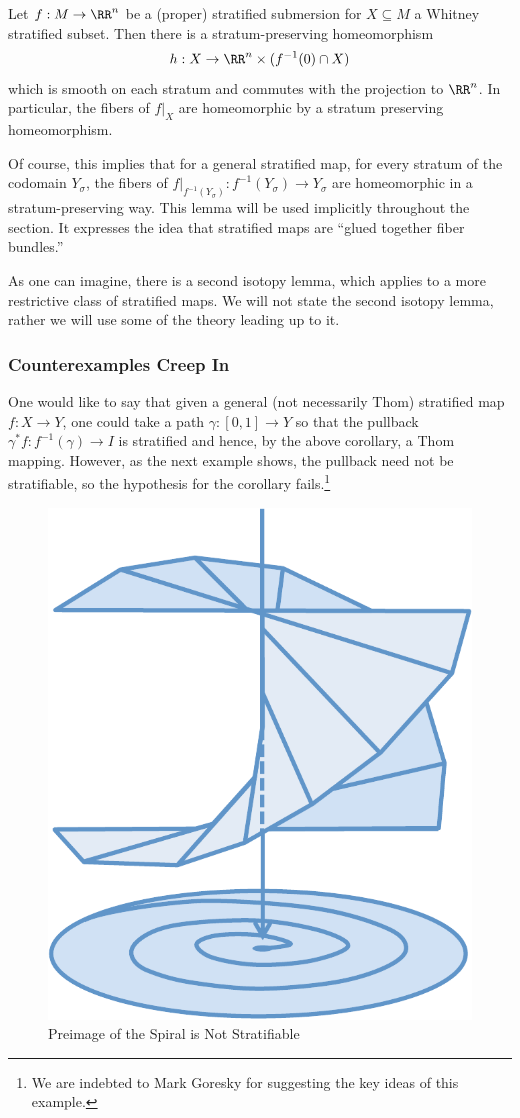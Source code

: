 \begin{lem}\label{lem:thom_1}
	Let $f:M\to \RR^n$ be a (proper) stratified submersion for $X\subseteq M$ a Whitney stratified subset. Then there is a stratum-preserving homeomorphism
	\[
	h: X \to \RR^n\times (f^{-1}(0)\cap X)
	\]
	which is smooth on each stratum and commutes with the projection to $\RR^n$. In particular, the fibers of $f|_X$ are homeomorphic by a stratum preserving homeomorphism.
\end{lem}
\begin{rmk}
	Of course, this implies that for a general stratified map, for every stratum of the codomain $Y_{\sigma}$, the fibers of $f|_{f^{-1}(Y_{\sigma})}:f^{-1}(Y_{\sigma}) \to Y_{\sigma}$ are homeomorphic in a stratum-preserving way. This lemma will be used implicitly throughout the section. It expresses the idea that stratified maps are ``glued together fiber bundles.''
\end{rmk}

As one can imagine, there is a second isotopy lemma, which applies to a more restrictive class of stratified maps. We will not state the second isotopy lemma, rather we will use some of the theory leading up to it.

\subsubsection{Counterexamples Creep In}

One would like to say that given a general (not necessarily Thom) stratified map $f:X\to Y$, one could take a path $\gamma:[0,1]\to Y$ so that the pullback $\gamma^* f:f^{-1}(\gamma)\to I$ is stratified and hence, by the above corollary, a Thom mapping. However, as the next example shows, the pullback need not be stratifiable, so the hypothesis for the corollary fails.\footnote{We are indebted to Mark Goresky for suggesting the key ideas of this example.}

\begin{figure}
\centering
\includegraphics[width=.7\textwidth]{blowup_spiral.pdf}
\caption{Preimage of the Spiral is Not Stratifiable}
\label{fig:blowup_cex}
\end{figure}

